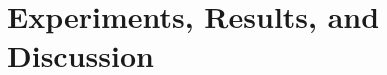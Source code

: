 \documentclass[UKenglish]{DUO/ifimaster}
\begin{document}
\frontmatter{}
\tableofcontents{}

\mainmatter{}
\setcounter{chapter}{3} %
\setcounter{footnote}{0}
\chapter{Experiments, Results, and Discussion}


\backmatter{}

\newpage
\printbibliography
\end{document}
